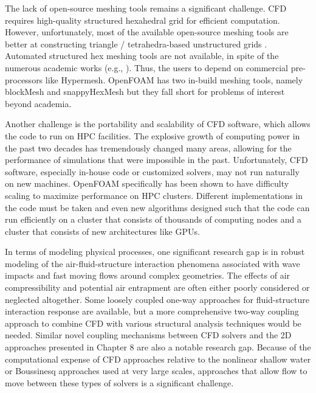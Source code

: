 The lack of open-source meshing tools remains a significant challenge. CFD requires high-quality structured hexahedral grid for efficient computation. However, unfortunately, most of the available open-source meshing tools are better at constructing triangle / tetrahedra-based unstructured grids \citep{geuzaine2009gmsh}. Automated structured hex meshing tools are not available, in spite of the numerous academic works (e.g., \cite{yamakawa2003fully, verhetsel2019finding, gao2017robust}). Thus, the users to depend on commercial pre-processors like Hypermesh. OpenFOAM has two in-build meshing tools, namely blockMesh and snappyHexMesh but they fall short for problems of interest beyond academia. 

Another challenge is the portability and scalability of CFD software, which allows the code to run on HPC facilities. The explosive growth of computing power in the past two decades has tremendously changed many areas, allowing for the performance of simulations that were impossible in the past. Unfortunately, CFD software, especially in-house code or customized solvers, may not run naturally on new machines.  OpenFOAM specifically has been shown to have difficulty scaling to maximize performance on HPC clusters. Different implementations in the code must be taken and even new algorithms designed such that the code can run efficiently on a cluster that consists of thousands of computing nodes and a cluster that consists of new architectures like GPUs.

In terms of modeling physical processes, one significant research gap is in robust modeling of the air-fluid-structure interaction phenomena associated with wave impacts and fast moving flows around complex geometries.  The effects of air compressibility and potential air entrapment are often either poorly considered or neglected altogether.  Some loosely coupled one-way approaches for fluid-structure interaction response are available, but a more comprehensive two-way coupling approach to combine CFD with various structural analysis techniques would be needed.  Similar novel coupling mechanisms between CFD solvers and the 2D approaches presented in Chapter 8 are also a notable research gap.  Because of the computational expense of CFD approaches relative to the nonlinear shallow water or Boussinesq approaches used at very large scales, approaches that allow flow to move between these types of solvers is a significant challenge.
